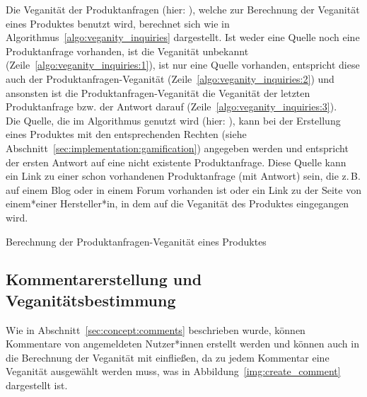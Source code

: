 Die Veganität der Produktanfragen (hier: ), welche zur
Berechnung der Veganität eines Produktes benutzt wird, berechnet sich wie in 
Algorithmus~\ref{algo:veganity_inquiries} dargestellt. Ist weder eine Quelle 
noch eine Produktanfrage vorhanden, ist die Veganität unbekannt 
(Zeile~\ref{algo:veganity_inquiries:1}), ist nur eine Quelle vorhanden, 
entspricht diese auch der Produktanfragen-Veganität 
(Zeile~\ref{algo:veganity_inquiries:2}) und ansonsten ist die 
Produktanfragen-Veganität die Veganität der letzten Produktanfrage bzw. der 
Antwort darauf (Zeile~\ref{algo:veganity_inquiries:3}).\\
Die Quelle, die im Algorithmus genutzt 
wird (hier: ), kann bei der Erstellung eines Produktes mit den 
entsprechenden Rechten (siehe Abschnitt~\ref{sec:implementation:gamification}) 
angegeben werden und entspricht
der ersten Antwort auf eine nicht existente Produktanfrage. Diese Quelle 
kann ein Link zu einer schon
vorhandenen Produktanfrage (mit Antwort) sein, die z.\,B. auf einem Blog 
oder in einem
Forum vorhanden ist oder ein Link zu der Seite von einem*einer Hersteller*in, 
in dem auf die Veganität des Produktes eingegangen wird.

\begin{algorithm}[ht]
  \SetAlgoLined
  \BlankLine
  
    
  \caption{Berechnung der Produktanfragen-Veganität eines Produktes}
  \label{algo:veganity_inquiries}
\end{algorithm}

\subsection{Kommentarerstellung und Veganitätsbestimmung}
\label{sec:implementation:comments}

Wie in Abschnitt~\ref{sec:concept:comments} beschrieben wurde, können 
Kommentare von angemeldeten Nutzer*innen erstellt werden und können auch in die 
Berechnung der Veganität mit einfließen, da zu jedem Kommentar eine Veganität 
ausgewählt werden muss, was in Abbildung~\ref{img:create_comment} dargestellt 
ist.


